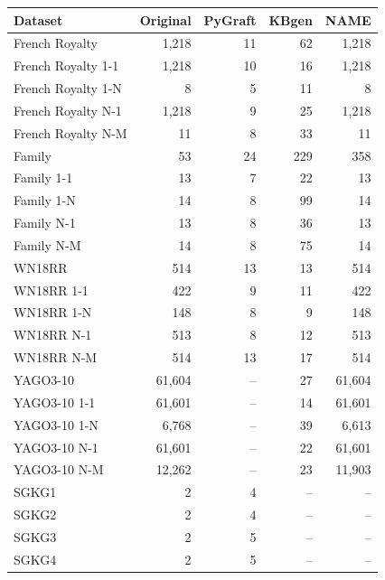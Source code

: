 \begin{tabular}{lrrrr}
\toprule
Dataset & Original & PyGraft & KBgen & NAME \\
\midrule
French Royalty & 1{,}218 & 11 & 62 & 1{,}218 \\
French Royalty 1-1 & 1{,}218 & 10 & 16 & 1{,}218 \\
French Royalty 1-N & 8 & 5 & 11 & 8 \\
French Royalty N-1 & 1{,}218 & 9 & 25 & 1{,}218 \\
French Royalty N-M & 11 & 8 & 33 & 11 \\
\midrule
Family & 53 & 24 & 229 & 358 \\
Family 1-1 & 13 & 7 & 22 & 13 \\
Family 1-N & 14 & 8 & 99 & 14 \\
Family N-1 & 13 & 8 & 36 & 13 \\
Family N-M & 14 & 8 & 75 & 14 \\
\midrule
WN18RR & 514 & 13 & 13 & 514 \\
WN18RR 1-1 & 422 & 9 & 11 & 422 \\
WN18RR 1-N & 148 & 8 & 9 & 148 \\
WN18RR N-1 & 513 & 8 & 12 & 513 \\
WN18RR N-M & 514 & 13 & 17 & 514 \\
\midrule
YAGO3-10 & 61{,}604 & – & 27 & 61{,}604 \\
YAGO3-10 1-1 & 61{,}601 & – & 14 & 61{,}601 \\
YAGO3-10 1-N & 6{,}768 & – & 39 & 6{,}613 \\
YAGO3-10 N-1 & 61{,}601 & – & 22 & 61{,}601 \\
YAGO3-10 N-M & 12{,}262 & – & 23 & 11{,}903 \\
\midrule
SGKG1 & 2 & 4 & – & – \\
SGKG2 & 2 & 4 & – & – \\
SGKG3 & 2 & 5 & – & – \\
SGKG4 & 2 & 5 & – & – \\
\bottomrule
\end{tabular}
